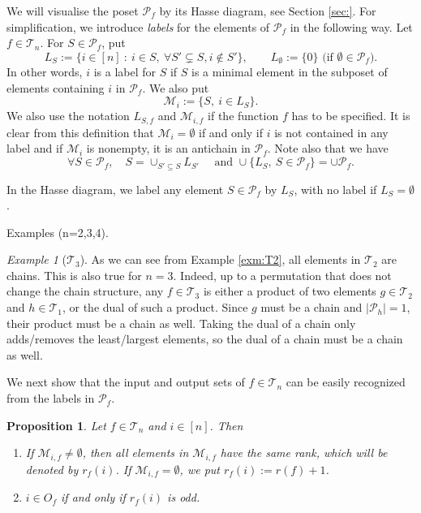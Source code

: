 \documentclass[12pt]{article}
\newtheorem{prop}{Proposition}
\theoremstyle{definition}
\theoremstyle{remark}
\newtheorem{exm}{Example}
\def\Me{\mathcal M}
\def\Te{\mathcal T}
\def\Pe{\mathcal P}
\begin{document}
We will visualise the poset $\Pe_f$  by its Hasse diagram, see Section \ref{sec:}. For simplification, we 
introduce {\em labels} for the elements of $\Pe_f$ in the following way. 
Let $f\in \Te_n$. For  $S\in \Pe_f$, put
\[
L_S:=\{i\in [n]\ : \ i\in S,\ \forall S'\subsetneq S, i\notin S'\},\qquad
L_\emptyset:=\{0\}\text{ (if $\emptyset\in \Pe_f$).}
\]
In other words, $i$ is a label for $S$ if $S$ is a minimal element in the subposet of
elements containing $i$ in  $\Pe_f$. We also put
\[
\Me_i:=\{S,\ i\in L_S\}.
\]
We also use the notation $L_{S,f}$ and $\Me_{i,f}$ if the function $f$ has to be
specified. It is clear from this definition that $\Me_i=\emptyset$ if and only if $i$ is
not contained in any label and  if $\Me_i$ is nonempty, it is an antichain in
$\Pe_f$.   Note also that we have
\[
\forall S\in \Pe_f,\quad S=\cup_{S'\subseteq S} L_{S'}\quad \text{ and }\cup\{L_S, \ S\in \Pe_f\}=\cup \Pe_f.
\]


In the Hasse diagram, we label any element  $S\in \Pe_f$ by  $L_S$, with no label if
$L_S=\emptyset$.

Examples (n=2,3,4).
\begin{exm}[$\Te_3$]
As we can see from Example \ref{exm:T2}, all elements in $\Te_2$ are chains. This is
also true for $n=3$. Indeed, up to a permutation that does not change the chain structure, 
any $f\in \Te_3$ is either a product of two elements $g\in \Te_2$ and $h\in \Te_1$,
or the dual of such a  product. Since $g$ must be a chain and $|\Pe_h|=1$, their product
must be a chain as well. Taking the dual of a chain only adds/removes the least/largest
elements, so the dual of a chain must be a chain as well.
\end{exm}



We next show that the input and output sets of $f\in \Te_n$ can be easily recognized from
the labels in $\Pe_f$. 

\begin{prop}\label{prop:pfinput} Let $f\in \Te_n$ and $i\in [n]$. Then
\begin{enumerate}
\item If $\Me_{i,f}\ne
\emptyset$, then all elements in $\Me_{i,f}$  have the same rank,  which will be
denoted by $r_f(i)$. If $\Me_{i,f}=\emptyset$, we put $r_f(i):=r(f)+1$. 
\item $i\in O_f$ if and only if $r_f(i)$ is odd.

\end{enumerate}
\end{prop}
\end{document}
